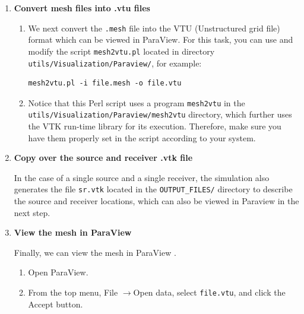\begin{enumerate}
\item \textbf{Convert mesh files into .vtu files}

\begin{enumerate}
\item We next convert the \texttt{.mesh} file into the VTU (Unstructured
grid file) format which can be viewed in ParaView. For this task,
you can use and modify the script \texttt{mesh2vtu.pl} located in
directory \texttt{utils/Visualization/Paraview/}, for example:

{\footnotesize
\begin{verbatim}
mesh2vtu.pl -i file.mesh -o file.vtu
\end{verbatim}
}

\item Notice that this Perl script uses a program \texttt{mesh2vtu} in the
\texttt{\small utils/Visualization/Paraview/mesh2vtu} directory, which further
uses the VTK  run-time library
for its execution. Therefore, make sure you have them properly set
in the script according to your system.
\end{enumerate}

\item \textbf{Copy over the source and receiver .vtk file}


In the case of a single source and a single receiver, the simulation
also generates the file \texttt{sr.vtk} located in the \texttt{OUTPUT\_FILES/}
directory to describe the source and receiver locations, which can
also be viewed in Paraview in the next step.

\item \textbf{View the mesh in ParaView}


Finally, we can view the mesh in ParaView .
\begin{enumerate}
\item Open ParaView.
\item From the top menu, \textsf{File} $\rightarrow$\textsf{Open data},
select \texttt{file.vtu}, and click the \textsf{Accept} button.


\end{enumerate}
\end{enumerate}
